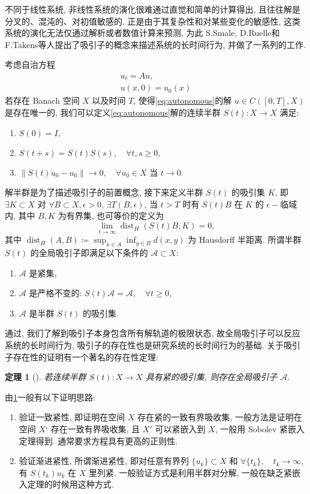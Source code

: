 \documentclass[oneside,longtitle]{LZUthesis}
\newtheorem{theorem}{定理}[chapter]
\theoremstyle{definition}
\numberwithin{equation}{chapter}
\newcommand*\norm[1]{\lVert#1\rVert}
\newcommand*\Brace[1]{\lbrace#1\rbrace}
\DeclareMathOperator{\dist}{dist}
\begin{document}
不同于线性系统, 非线性系统的演化很难通过直觉和简单的计算得出,
且往往解是分叉的、混沌的、对初值敏感的,
正是由于其复杂性和对某些变化的敏感性, 这类系统的演化无法仅通过解析或者数值计算来预测,
为此 S.Smale, D.Ruelle和F.Takens等人提出了吸引子的概念来描述系统的长时间行为,
并做了一系列的工作.

考虑自治方程
\begin{equation}\label{eq:autonomous}
	\begin{gathered}
		u_t = Au,\\
		u(x, 0) = u_0(x)
	\end{gathered}
\end{equation}
若存在 Banach 空间 $X$ 以及时间 $T$, 使得\cref{eq:autonomous}的解 $u \in C([0, T], X)$ 是存在唯一的,
我们可以定义\cref{eq:autonomous}解的连续半群 $S(t) \colon X \to X$ 满足:
\begin{enumerate}
	\item $S(0) = I,$
	\item $S(t + s) = S(t)S(s), \quad \forall t, s \geq 0,$
	\item $\norm{S(t)u_0 - u_0} \to 0, \quad\forall u_0 \in X$ 当 $t \to 0$.
\end{enumerate}
解半群是为了描述吸引子的前置概念, 接下来定义半群 $S(t)$ 的吸引集 $K$,
即 $\exists K \subset X$
对 $\forall B \subset X, \epsilon > 0$, $\exists T(B, \epsilon)$,
当 $t > T$ 时有 $S(t)B$ 在 $K$ 的 $\epsilon-$临域内,
其中 $B, K$ 为有界集, 也可等价的定义为
\begin{equation}
	\lim_{t \to \infty} \dist_H(S(t)B, K) = 0,
\end{equation}
其中 $\dist_H(A, B) \coloneqq \sup_{x \in A}\inf_{y \in B}d(x, y)$ 为 Hausdorff 半距离.
所谓半群 $S(t)$ 的全局吸引子即满足以下条件的 $\mathcal{A} \subset X$:
\begin{enumerate}
	\item $\mathcal{A}$ 是紧集,
	\item $\mathcal{A}$ 是严格不变的: $S(t)\mathcal{A} = \mathcal{A}, \quad\forall t \geq 0$,
	\item $\mathcal{A}$ 是半群 $S(t)$ 的吸引集.
\end{enumerate}
通过\citep{efendievAttractorsDegenerateParabolic2013b}, 我们了解到吸引子本身包含所有解轨道的极限状态,
故全局吸引子可以反应系统的长时间行为, 吸引子的存在性也是研究系统的长时间行为的基础.
关于吸引子存在性的证明有一个著名的存在性定理:
\begin{theorem}[\citep{efendievAttractorsDegenerateParabolic2013b}]\label{thm:attractorexist}
	若连续半群 $S(t): X \to X$ 具有紧的吸引集, 则存在全局吸引子 $\mathcal{A}$.
\end{theorem}
由\cref{thm:attractorexist}一般有以下证明思路:
\begin{enumerate}
	\item 验证一致紧性, 即证明在空间 $X$ 存在紧的一致有界吸收集,
	一般方法是证明在空间 $X‘$ 存在一致有界吸收集, 且 $X'$ 可以紧嵌入到 $X$,
	一般用 Sobolev 紧嵌入定理得到. 通常要求方程具有更高的正则性.
	\item 验证渐进紧性, 所谓渐进紧性, 即对任意有界列 $\Brace{u_k} \subset X$ 和
	$\forall \Brace{t_k}, \quad t_k \to \infty$, 有 $S(t_k)u_k$ 在 $X$ 里列紧.
	一般验证方式是利用半群对分解, 一般在缺乏紧嵌入定理的时候用这种方式.
\end{enumerate}
\end{document}

